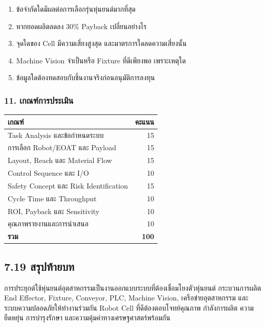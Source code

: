 \begin{enumerate}
    \item ข้อจำกัดใดมีผลต่อการเลือกรุ่นหุ่นยนต์มากที่สุด
    \item หากยอดผลิตลดลง 30\% Payback เปลี่ยนอย่างไร
    \item จุดใดของ Cell มีความเสี่ยงสูงสุด และมาตรการใดลดความเสี่ยงนั้น
    \item Machine Vision จำเป็นหรือ Fixture ที่ดีเพียงพอ เพราะเหตุใด
    \item ข้อมูลใดต้องทดสอบกับชิ้นงานจริงก่อนอนุมัติการลงทุน
\end{enumerate}

\subsubsection{11. เกณฑ์การประเมิน}

\begin{table}[htbp]
    \centering
    \begin{tabular}{l r}
        \hline
        \textbf{เกณฑ์} & \textbf{คะแนน} \\
        \hline
        Task Analysis และข้อกำหนดระบบ & 15 \\
        การเลือก Robot/EOAT และ Payload & 15 \\
        Layout, Reach และ Material Flow & 15 \\
        Control Sequence และ I/O & 10 \\
        Safety Concept และ Risk Identification & 15 \\
        Cycle Time และ Throughput & 10 \\
        ROI, Payback และ Sensitivity & 10 \\
        คุณภาพรายงานและการนำเสนอ & 10 \\
        \textbf{รวม} & \textbf{100} \\
        \hline
    \end{tabular}
\end{table}


\subsection{7.19 สรุปท้ายบท}

การประยุกต์ใช้หุ่นยนต์อุตสาหกรรมเป็นงานออกแบบระบบที่ต้องเชื่อมโยงตัวหุ่นยนต์ กระบวนการผลิต End Effector, Fixture, Conveyor, PLC, Machine Vision, เครือข่ายอุตสาหกรรม และระบบความปลอดภัยให้ทำงานร่วมกัน Robot Cell ที่ดีต้องตอบโจทย์คุณภาพ กำลังการผลิต ความยืดหยุ่น การบำรุงรักษา และความคุ้มค่าทางเศรษฐศาสตร์พร้อมกัน

